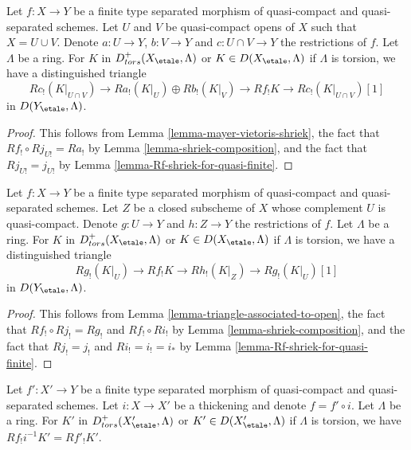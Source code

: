 \begin{lemma}
\label{lemma-relative-mayer-vietoris}
Let $f : X \to Y$ be a finite type separated morphism of quasi-compact and
quasi-separated schemes. Let $U$ and $V$ be quasi-compact opens of $X$
such that $X = U \cup V$. Denote $a : U \to Y$, $b : V \to Y$ and
$c : U \cap V \to Y$ the restrictions of $f$. Let $\Lambda$ be a ring.
For $K$ in $D^+_{tors}(X_\etale, \Lambda)$ or $K \in D(X_\etale, \Lambda)$
if $\Lambda$ is torsion, we have a distinguished triangle
$$
Rc_!(K|_{U \cap V}) \to
Ra_!(K|_U) \oplus Rb_!(K|_V) \to
Rf_!K \to 
Rc_!(K|_{U \cap V})[1]
$$
in $D(Y_\etale, \Lambda)$.
\end{lemma}

\begin{proof}
This follows from Lemma \ref{lemma-mayer-vietoris-shriek},
the fact that $Rf_! \circ Rj_{U!} = Ra_!$ by
Lemma \ref{lemma-shriek-composition}, and the fact that
$Rj_{U!} = j_{U!}$ by Lemma \ref{lemma-Rf-shriek-for-quasi-finite}.
\end{proof}

\begin{lemma}
\label{lemma-relative-triangle-associated-to-open}
Let $f : X \to Y$ be a finite type separated morphism of quasi-compact and
quasi-separated schemes. Let $Z$ be a closed subscheme of $X$ whose
complement $U$ is quasi-compact. Denote $g : U \to Y$ and $h : Z \to Y$
the restrictions of $f$. Let $\Lambda$ be a ring.
For $K$ in $D^+_{tors}(X_\etale, \Lambda)$ or $K \in D(X_\etale, \Lambda)$
if $\Lambda$ is torsion, we have a distinguished triangle
$$
Rg_!(K|_U) \to
Rf_!K \to
Rh_!(K|_Z) \to
Rg_!(K|_U)[1]
$$
in $D(Y_\etale, \Lambda)$.
\end{lemma}

\begin{proof}
This follows from
Lemma \ref{lemma-triangle-associated-to-open},
the fact that $Rf_! \circ Rj_! = Rg_!$ and $Rf_! \circ Ri_!$ by
Lemma \ref{lemma-shriek-composition}, and the fact that
$Rj_! = j_!$ and $Ri_! = i_! = i_*$ by
Lemma \ref{lemma-Rf-shriek-for-quasi-finite}.
\end{proof}

\begin{lemma}
\label{lemma-shriek-and-thickening}
Let $f' : X' \to Y$ be a finite type separated morphism of quasi-compact and
quasi-separated schemes. Let $i : X \to X'$ be a thickening and
denote $f = f' \circ i$. Let $\Lambda$ be a ring.
For $K'$ in $D^+_{tors}(X'_\etale, \Lambda)$ or $K' \in D(X'_\etale, \Lambda)$
if $\Lambda$ is torsion, we have $Rf_!i^{-1}K' = Rf'_!K'$.
\end{lemma}

